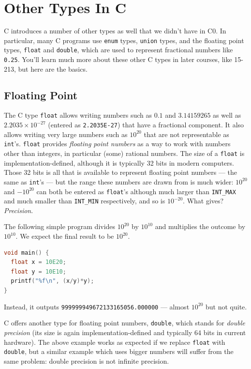 \section{Other Types In C}
\label{sec:types:enum_union_float_double}

C introduces a number of other types as well that we didn't have in
C0.  In particular, many C programs use \lstinline'enum' types,
\lstinline'union' types, and the floating point types,
\lstinline'float' and \lstinline'double', which are used to represent
fractional numbers like \lstinline'0.25'. You'll learn much more about
these other C types in later courses, like 15-213, but here are the
basics.

\subsection{Floating Point}
\label{sec:types:floats}

The C type \lstinline'float' allows writing numbers such as $0.1$ and
$3.14159265$ as well as $2.2035 \times 10^{-27}$ (entered as
\lstinline'2.2035E-27') that have a fractional component.  It also
allows writing very large numbers such as $10^{20}$ that are not
representable as \lstinline'int''s.  \lstinline'float' provides
\emph{floating point numbers} as a way to work with numbers other than
integers, in particular (some) rational numbers.  The size of a
\lstinline'float' is implementation-defined, although it is typically
32 bits in modern computers.  Those 32 bits is all that is available
to represent floating point numbers --- the same as \lstinline'int''s
--- but the range these numbers are drawn from is much wider:
$10^{20}$ and $-10^{20}$ can both be entered as \lstinline'float''s
although much larger than \lstinline'INT_MAX' and much smaller than
\lstinline'INT_MIN' respectively, and so is $10^{-20}$.  What gives?
\emph{Precision}.

The following simple program divides $10^{20}$ by $10^{10}$ and
multiplies the outcome by $10^{10}$.  We expect the final result to be
$10^{20}$.
\begin{lstlisting}[language=c]
void main() {
  float x = 10E20;
  float y = 10E10;
  printf("%f\n", (x/y)*y);
}
\end{lstlisting}
Instead, it outputs \lstinline'999999949672133165056.000000' ---
almost $10^{20}$ but not quite.

C offers another type for floating point numbers, \lstinline'double',
which stands for \emph{double precision} (its size is again
implementation-defined and typically 64 bits in current hardware).
The above example works as expected if we replace \lstinline'float'
with \lstinline'double', but a similar example which uses bigger
numbers will suffer from the same problem: double precision is not
infinite precision.

